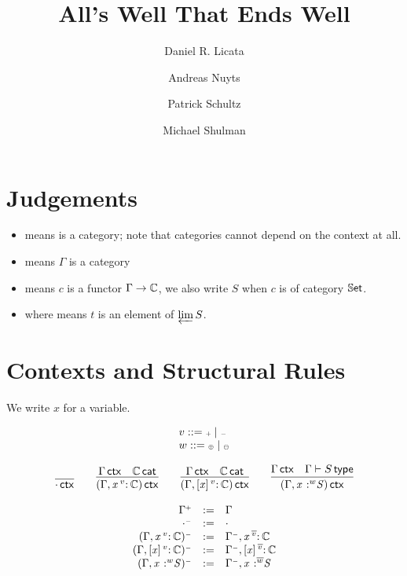 \documentclass[11pt]{article}
\title{All's Well That Ends Well}
\author{Daniel R. Licata \and Andreas Nuyts \and Patrick Schultz \and Michael Shulman}
\theoremstyle{plain}
\begin{document}
\maketitle

\section{Judgements}

\begin{itemize}

\item \wfdtp{\C} means \C\/ is a category; note that categories cannot
  depend on the context at all.  

\item \wfctx{\G} means $\Gamma$ is a category

\item {} means $c$ is a functor
  ${\Gamma} \to \mathbb{C}$, we also write $S$ when $c$ is of category $\mathbb{S}\mathsf{et}$.  

\item {} where
   means $t$ is an element of $\varprojlim S$.

\end{itemize}

\section{Contexts and Structural Rules}

We write $x$ for a variable. 

\[
\begin{array}{l}
v ::= {\text{\tiny $\mathord{+}$}} \mid {\text{\tiny $\mathord{-}$}} \\
w ::= {\text{\tiny $\mathord{\oplus}$}} \mid {\text{\tiny $\mathord{\ominus}$}} \\
\end{array}
\]

\[
\begin{array}{c}
\infer{\wfctx{\cdot}}{}
\qquad
\infer{\wfctx{(\Gamma,\catvar{x}{v}{\C})}}
      {\wfctx{\Gamma} & 
       \wfdtp{\C}
      } 
\qquad
\infer{\wfctx{(\Gamma,\twcatvar{x}{v}{\C})}}
      {\wfctx{\Gamma} & 
       \wfdtp{\C}
      } 
\qquad
\infer{\wfctx{(\Gamma,\tpvar{x}{w}{S})}}
      {\wfctx{\Gamma} & 
        \wftp{\Gamma}{S}
      } 
\end{array}
\]

\[
\begin{array}{rcl}
\Gamma^{{\text{\tiny $\mathord{+}$}}} & := & \Gamma \\
\cdot^{{\text{\tiny $\mathord{-}$}}} & := & \cdot \\
({\Gamma},\mathit{x} \,^{v}{:}^{\,} \mathit{\mathbb{C}})^{{\text{\tiny $\mathord{-}$}}} & := & {\Gamma^{{\text{\tiny $\mathord{-}$}}}},\mathit{x} \,^{\overline{v}}{:}^{\,} \mathit{\mathbb{C}} \\
({\Gamma},[\mathit{x}] \,^{v}{:}^{\,} \mathit{\mathbb{C}})^{{\text{\tiny $\mathord{-}$}}} & := & {\Gamma^{{\text{\tiny $\mathord{-}$}}}},[\mathit{x}] \,^{\overline{v}}{:}^{\,} \mathit{\mathbb{C}} \\
({\Gamma},\mathit{x} \,^{\,}{:}^{w} \mathit{S})^{{\text{\tiny $\mathord{-}$}}} & := & {\Gamma^{{\text{\tiny $\mathord{-}$}}}},\mathit{x} \,^{\,}{:}^{\overline{w}} \mathit{S} \\
\end{array}
\]
\end{document}
